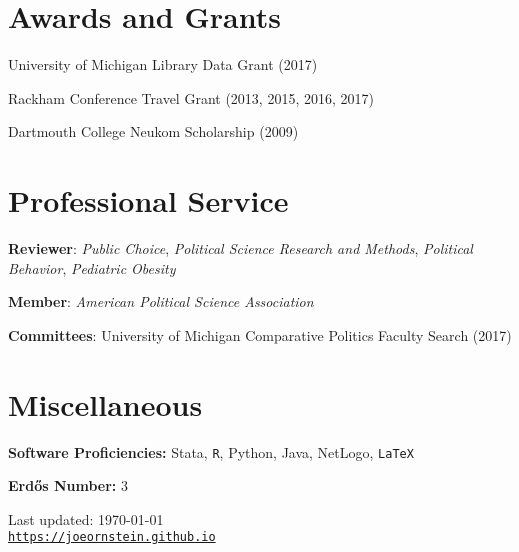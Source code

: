 \documentclass[letterpaper]{article}
\def\footerlink{https://joeornstein.github.io}
\renewenvironment{itemize}{
  \begin{list}{}{
    \setlength{\leftmargin}{1.5em}
  }
}{
  \end{list}
}
\begin{document}
\section*{Awards and Grants}
\begin{itemize}
\item University of Michigan Library Data Grant (2017)
\item Rackham Conference Travel Grant (2013, 2015, 2016, 2017)
\item Dartmouth College Neukom Scholarship (2009)
\end{itemize}

\hrulefill

\section*{Professional Service}

\begin{itemize}
\item \textbf{Reviewer}: \textit{Public Choice}, \textit{Political Science Research and Methods}, \textit{Political Behavior}, \textit{Pediatric Obesity}
\item \textbf{Member}: \textit{American Political Science Association}
\item \textbf{Committees}: University of Michigan Comparative Politics Faculty Search (2017)
\end{itemize}

\hrulefill

\section*{Miscellaneous}
\begin{itemize}
\item \textbf{Software Proficiencies:} Stata, {\tt R}, Python, Java, NetLogo, {\tt LaTeX}
\item \textbf{Erd\H{o}s Number:} 3
\end{itemize}

\bigskip

\begin{center}
  \begin{footnotesize}
    Last updated: \today \\
    \href{\footerlink}{\texttt{\footerlink}}
  \end{footnotesize}
\end{center}
\end{document}
